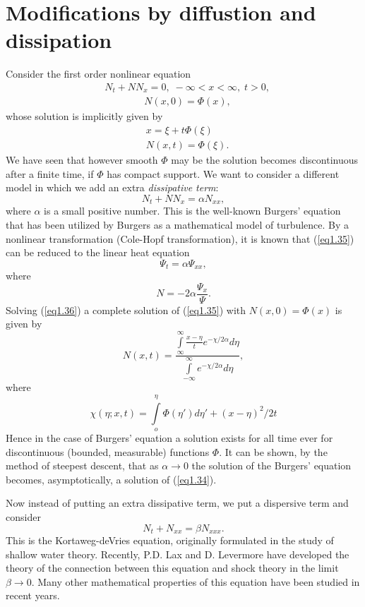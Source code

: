 \section{Modifications by diffustion and dissipation}\label{chap1:sec1.5}
Consider the first order nonlinear equation
\begin{align*}
& N_t  + NN_x = 0, \; -\infty < x < \infty, \; t >0, \tag{1.34}\label{eq1.34}\\
& \qquad \qquad N(x,0) = \Phi (x), 
\end{align*}
whose solution is implicitly given by 
\begin{align*}
& x = \xi + t \Phi (\xi)\\
& N (x,t) = \Phi (\xi).
\end{align*}\pageoriginale
We have seen that however smooth $\Phi$ may be the solution becomes discontinuous after a finite time, if $\Phi$ has compact support. We want to consider a different model in which we add an extra {\em dissipative term}:
\begin{equation*}
N_t + NN_x = \alpha N_{xx}, \tag{1.35}\label{eq1.35}
\end{equation*}
where $\alpha$ is a small positive number. This is the well-known Burgers' equation that has been utilized by Burgers as a mathematical model of turbulence. By a nonlinear transformation (Cole-Hopf transformation), it is known that (\ref{eq1.35}) can be reduced to the linear heat equation
\begin{equation*}
\Psi_t = \alpha \Psi_{xx}, \tag{1.36}\label{eq1.36}
\end{equation*}
where 
\begin{equation*}
N = -2 \alpha \frac{\Psi_x}{\Psi}.
\end{equation*}
Solving (\ref{eq1.36}) a complete solution of (\ref{eq1.35}) with $N(x,0) = \Phi (x)$ is given by
$$
N(x,t) = \frac{\int\limits^\infty_{\infty} \frac{x-\eta}{t} e^{-\chi/2\alpha} d \eta}{\int\limits^\infty_{-\infty} e^{-\chi/2\alpha} d \eta},
$$
where 
$$
\chi (\eta; x,t) = \int\limits^\eta_o \Phi (\eta') d \eta' + (x-\eta)^2 / 2t
$$
Hence in the case of Burgers' equation a solution exists for all time
ever for discontinuous (bounded, measurable) functions\pageoriginale
$\Phi$. It can be shown, by the method of steepest descent, that as
$\alpha \to 0$ the  solution of the Burgers' equation becomes,
asymptotically, a solution of (\ref{eq1.34}). 

Now instead of putting an extra dissipative term, we put a dispersive term and consider
\begin{equation*}
N_t + N_{xx} = \beta N_{xxx}. \tag{1.37}\label{eq1.37}
\end{equation*}
This is the Kortaweg-deVries equation, originally formulated in the\break
study of shallow water theory. Recently, P.D. Lax and D. Levermore
have developed the theory of the connection between this equation and
shock theory in the limit $\beta \to 0$. Many other mathematical
properties of this equation have been studied in recent years. 

